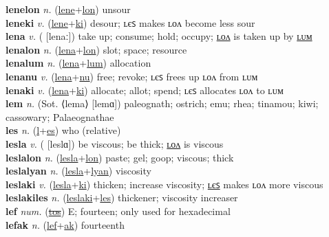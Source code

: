 \textbf{lenelon} \textit{n.} (\hyperref[lene]{lene}+\hyperref[lon]{lon})
unsour \label{lenelon} \\
\textbf{leneki} \textit{v.} (\hyperref[lene]{lene}+\hyperref[ki]{ki})
desour; ʟєꜱ makes ʟᴏᴧ become less sour \label{leneki} \\
\textbf{lena} \textit{v.} ( [lenaː])
take up; consume; hold; occupy; \hyperref[lenalon]{ʟᴏᴧ} is taken up by \hyperref[lenalum]{ʟᴜᴍ} \label{lena} \\
\textbf{lenalon} \textit{n.} (\hyperref[lena]{lena}+\hyperref[lon]{lon})
slot; space; resource \label{lenalon} \\
\textbf{lenalum} \textit{n.} (\hyperref[lena]{lena}+\hyperref[lum]{lum})
allocation \label{lenalum} \\
\textbf{lenanu} \textit{v.} (\hyperref[lena]{lena}+\hyperref[nu]{nu})
free; revoke; ʟєꜱ frees up ʟᴏᴧ from ʟᴜᴍ \label{lenanu} \\
\textbf{lenaki} \textit{v.} (\hyperref[lena]{lena}+\hyperref[ki]{ki})
allocate; allot; spend; ʟєꜱ allocates ʟᴏᴧ to ʟᴜᴍ \label{lenaki} \\
\textbf{lem} \textit{n.} (Sot. ⟨lema⟩ [lemɑ])
paleognath; ostrich; emu; rhea; tinamou; kiwi; cassowary; Palaeognathae \label{lem} \\
\textbf{les} \textit{n.} (\hyperref[l]{l}+\hyperref[es]{es})
who (relative) \label{les} \\
\textbf{lesla} \textit{v.} ( [leslɑ])
be viscous; be thick; \hyperref[leslalon]{ʟᴏᴧ} is viscous \label{lesla} \\
\textbf{leslalon} \textit{n.} (\hyperref[lesla]{lesla}+\hyperref[lon]{lon})
paste; gel; goop; viscous; thick \label{leslalon} \\
\textbf{leslalyan} \textit{n.} (\hyperref[lesla]{lesla}+\hyperref[lyan]{lyan})
viscosity \label{leslalyan} \\
\textbf{leslaki} \textit{v.} (\hyperref[lesla]{lesla}+\hyperref[ki]{ki})
thicken; increase viscosity; \hyperref[leslakiles]{ʟєꜱ} makes ʟᴏᴧ more viscous \label{leslaki} \\
\textbf{leslakiles} \textit{n.} (\hyperref[leslaki]{leslaki}+\hyperref[les]{les})
thickener; viscosity increaser \label{leslakiles} \\
\textbf{lef} \textit{num.} (\hyperref[tos]{\sout{tos}})
E; fourteen; only used for hexadecimal \label{lef} \\
\textbf{lefak} \textit{n.} (\hyperref[lef]{lef}+\hyperref[ak]{ak})
fourteenth \label{lefak} \\
